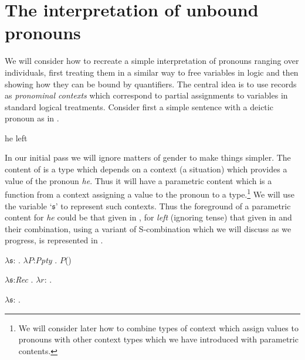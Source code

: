 \section{The interpretation of unbound pronouns}
\label{sec:unbound}
We will consider how to recreate a simple interpretation of pronouns
ranging over individuals, first treating them in a similar way to free
variables in logic and then showing how they can be bound by
quantifiers.  The central idea is to use records as \textit{pronominal
  contexts} which correspond to partial assignments to variables in
standard logical treatments.  Consider first a simple sentence with a deictic
pronoun as in \nexteg{}.
\begin{ex} 
he left 
\end{ex} 
In our initial pass we will ignore matters
of gender to make things simpler.  The content of \preveg{} is a type
which depends on a context (a situation) which provides a value of the
pronoun \textit{he}. Thus it will have a parametric content which is a
function from a context assigning a value to the pronoun to a
type.\footnote{We will consider later how to combine types of context
  which assign values to pronouns with other context types which we
  have introduced with parametric contents.}  We will use the variable
`$\mathfrak{s}$' to represent such contexts.  Thus the foreground of a parametric content for
\textit{he} could be that given in , for \textit{left}
(ignoring tense) that given in  and their combination, using a variant
of S-combination which we will discuss as we progress, is represented
in .
\begin{ex} 
\begin{subex} 
 
\item $\lambda\mathfrak{s}$: . 
        $\lambda P$:\textit{Ppty} . $P$()
 
\item $\lambda\mathfrak{s}$:\textit{Rec} . 
        $\lambda r$: . 

\item $\lambda\mathfrak{s}$:
  . 
 
\end{subex} 
   
\end{ex}
